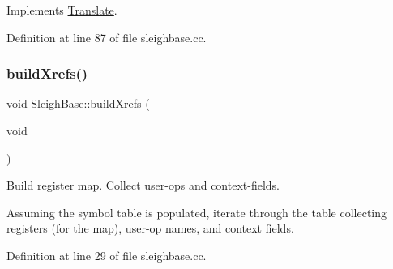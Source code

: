 Implements \mbox{\hyperlink{class_translate_a2614aefa5c03a9f1ed0b2dba794cad2c}{Translate}}.



Definition at line 87 of file sleighbase.\+cc.

\mbox{\label{class_sleigh_base_a25a5389699beb6eeb71db527808cddf7}} 
\subsubsection{\texorpdfstring{buildXrefs()}{buildXrefs()}}
{\footnotesize\ttfamily void Sleigh\+Base\+::build\+Xrefs (\begin{DoxyParamCaption}\item[{void}]{ }\end{DoxyParamCaption})\hspace{0.3cm}{\ttfamily [protected]}}



Build register map. Collect user-\/ops and context-\/fields. 

Assuming the symbol table is populated, iterate through the table collecting registers (for the map), user-\/op names, and context fields. 

Definition at line 29 of file sleighbase.\+cc.

